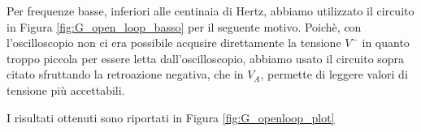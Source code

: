 Per frequenze basse, inferiori alle centinaia di Hertz, abbiamo utilizzato il circuito in Figura \ref{fig:G_open_loop_basso} per il seguente motivo. Poichè, con l'oscilloscopio non ci era possibile acqusire direttamente la tensione $V^-$ in quanto troppo piccola per essere letta dall'oscilloscopio, abbiamo usato il circuito sopra citato sfruttando la retroazione negativa, che in $V_A$, permette di leggere valori di tensione più accettabili.

I risultati ottenuti sono riportati in Figura \ref{fig:G_openloop_plot}